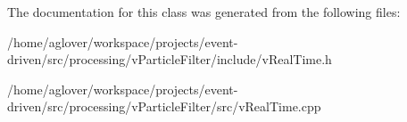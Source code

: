 The documentation for this class was generated from the following files\+:\begin{DoxyCompactItemize}
\item 
/home/aglover/workspace/projects/event-\/driven/src/processing/v\+Particle\+Filter/include/v\+Real\+Time.\+h\item 
/home/aglover/workspace/projects/event-\/driven/src/processing/v\+Particle\+Filter/src/v\+Real\+Time.\+cpp\end{DoxyCompactItemize}
